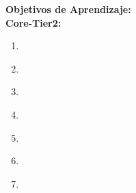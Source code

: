 \noindent \textbf{Objetivos de Aprendizaje:}\\
\noindent \textbf{Core-Tier2:}
\begin{enumerate}
	\setcounter{enumi}{0}
	\item \ARMachinelevelrepresentationofdataLOExplainWhyData\xspace[\ARMachinelevelrepresentationofdataLOExplainWhyDataLevel]\label{sec:BOK:ARMachinelevelrepresentationofdataLOExplainWhyData}
	\item \ARMachinelevelrepresentationofdataLOExplainTheUsing\xspace[\ARMachinelevelrepresentationofdataLOExplainTheUsingLevel]\label{sec:BOK:ARMachinelevelrepresentationofdataLOExplainTheUsing}
	\item \ARMachinelevelrepresentationofdataLODescribeHowAre\xspace[\ARMachinelevelrepresentationofdataLODescribeHowAreLevel]\label{sec:BOK:ARMachinelevelrepresentationofdataLODescribeHowAre}
	\item \ARMachinelevelrepresentationofdataLOExplainHowNumber\xspace[\ARMachinelevelrepresentationofdataLOExplainHowNumberLevel]\label{sec:BOK:ARMachinelevelrepresentationofdataLOExplainHowNumber}
	\item \ARMachinelevelrepresentationofdataLODescribeTheOf\xspace[\ARMachinelevelrepresentationofdataLODescribeTheOfLevel]\label{sec:BOK:ARMachinelevelrepresentationofdataLODescribeTheOf}
	\item \ARMachinelevelrepresentationofdataLOConvertNumerical\xspace[\ARMachinelevelrepresentationofdataLOConvertNumericalLevel]\label{sec:BOK:ARMachinelevelrepresentationofdataLOConvertNumerical}
	\item \ARMachinelevelrepresentationofdataLOWrite\xspace[\ARMachinelevelrepresentationofdataLOWriteLevel]\label{sec:BOK:ARMachinelevelrepresentationofdataLOWrite}
\end{enumerate}


